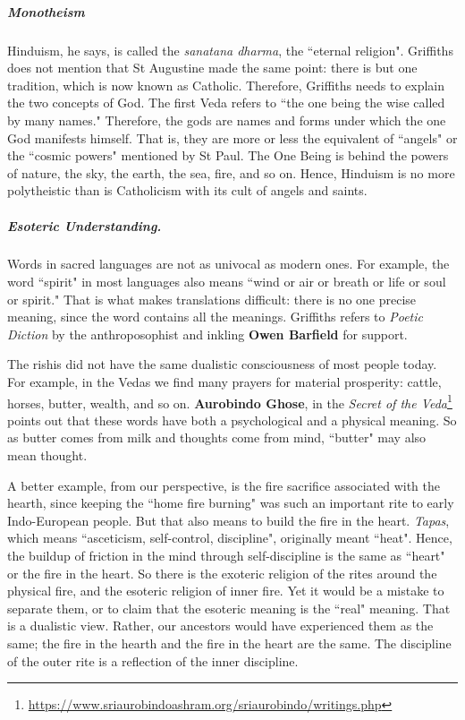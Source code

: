 \subparagraph{Monotheism}
Hinduism, he says, is called the \emph{sanatana dharma}, the ``eternal religion". Griffiths does not mention that St Augustine made the same point: there is but one tradition, which is now known as Catholic. Therefore, Griffiths needs to explain the two concepts of God. The first Veda refers to ``the one being the wise called by many names." Therefore, the gods are names and forms under which the one God manifests himself. That is, they are more or less the equivalent of ``angels" or the ``cosmic powers" mentioned by St Paul. The One Being is behind the powers of nature, the sky, the earth, the sea, fire, and so on. Hence, Hinduism is no more polytheistic than is Catholicism with its cult of angels and saints.

\subparagraph{Esoteric Understanding.}
Words in sacred languages are not as univocal as modern ones. For example, the word ``spirit" in most languages also means ``wind or air or breath or life or soul or spirit." That is what makes translations difficult: there is no one precise meaning, since the word contains all the meanings. Griffiths refers to \emph{Poetic Diction} by the anthroposophist and inkling \textbf{Owen Barfield} for support.

The rishis did not have the same dualistic consciousness of most people today. For example, in the Vedas we find many prayers for material prosperity: cattle, horses, butter, wealth, and so on. \textbf{Aurobindo Ghose}, in the \textit{Secret of the Veda}\footnote{\url{https://www.sriaurobindoashram.org/sriaurobindo/writings.php}} points out that these words have both a psychological and a physical meaning. So as butter comes from milk and thoughts come from mind, ``butter" may also mean thought.

A better example, from our perspective, is the fire sacrifice associated with the hearth, since keeping the ``home fire burning" was such an important rite to early Indo-European people. But that also means to build the fire in the heart. \emph{Tapas}, which means ``asceticism, self-control, discipline", originally meant ``heat". Hence, the buildup of friction in the mind through self-discipline is the same as ``heart" or the fire in the heart. So there is the exoteric religion of the rites around the physical fire, and the esoteric religion of inner fire. Yet it would be a mistake to separate them, or to claim that the esoteric meaning is the ``real" meaning. That is a dualistic view. Rather, our ancestors would have experienced them as the same; the fire in the hearth and the fire in the heart are the same. The discipline of the outer rite is a reflection of the inner discipline.

